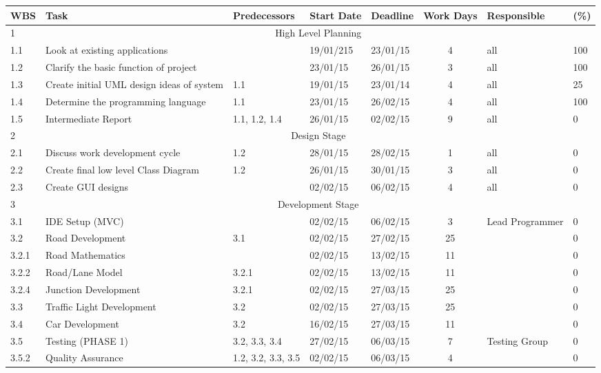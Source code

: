 \documentclass[a4paper,11pt]{article}
\begin{document}
\begin{table}[ht]
\begin{adjustwidth}{-2cm}{}
\begin{tabular}{|m{0.8cm}|m{6cm}|m{2.3cm}|m{1.3cm}|m{1.3cm}|c|m{2.6cm}|m{0.5cm}|}
			
			\bf{WBS} & \bf{Task} & \bf{Predecessors} & \bf{Start Date} & \bf{Deadline} & \bf{Work Days} & \bf{Responsible} & \bf{(\%)} \\ \hline 
			1 & \multicolumn{7}{c|}{High Level Planning}  \\\hline 
			1.1 & Look at existing applications &  & 19/01/215 & 23/01/15 & 4 & all & 100 \\ \hline 
			1.2 & Clarify the basic function of project &  & 23/01/15 & 26/01/15 & 3 & all & 100 \\ \hline 
			1.3 & Create initial UML design ideas of system & 1.1 & 19/01/15 & 23/01/14 & 4 & all & 25 \\ \hline 
			1.4 & Determine the programming language & 1.1 & 23/01/15 & 26/02/15 & 4 & all & 100 \\\hline 
			1.5 & Intermediate Report & 1.1, 1.2, 1.4 & 26/01/15 & 02/02/15 & 9 & all & 0 \\\hline 
			2 & \multicolumn{7}{c|}{Design Stage}  \\\hline 
			2.1 & Discuss work development cycle  & 1.2 & 28/01/15 & 28/02/15 & 1 & all & 0 \\\hline 
			2.2 & Create final low level Class Diagram  & 1.2 & 26/01/15 & 30/01/15 & 3 & all & 0 \\\hline 
			2.3 & Create GUI designs  &  & 02/02/15 & 06/02/15 & 4 & all & 0 \\\hline 
			3 & \multicolumn{7}{c|}{Development Stage}  \\\hline 
			3.1 & IDE Setup (MVC) &  & 02/02/15 & 06/02/15 & 3 & Lead Programmer & 0 \\\hline 
			3.2 & Road Development  & 3.1 & 02/02/15 & 27/02/15 & 25 &  & 0 \\\hline 
			3.2.1 & Road Mathematics  &  & 02/02/15 & 13/02/15 & 11 &  & 0 \\\hline 
			3.2.2 & Road/Lane Model & 3.2.1 & 02/02/15 & 13/02/15 & 11 &  & 0 \\\hline 
			3.2.4 & Junction Development  & 3.2.1 & 02/02/15 & 27/03/15 & 25 &  & 0 \\\hline 
			3.3 & Traffic Light Development & 3.2 & 02/02/15 & 27/03/15 & 25 &  & 0 \\\hline 
			3.4 & Car Development & 3.2 & 16/02/15 & 27/03/15 & 11 &  & 0 \\\hline 
			3.5 & Testing (PHASE 1) & 3.2, 3.3, 3.4 & 27/02/15 & 06/03/15 & 7 & Testing Group & 0 \\\hline 
			3.5.2 & Quality Assurance  & 1.2, 3.2, 3.3, 3.5 & 02/02/15 & 06/03/15 & 4 &  & 0 \\\hline 

\end{tabular}
\end{adjustwidth}
\end{table}
\end{document}
